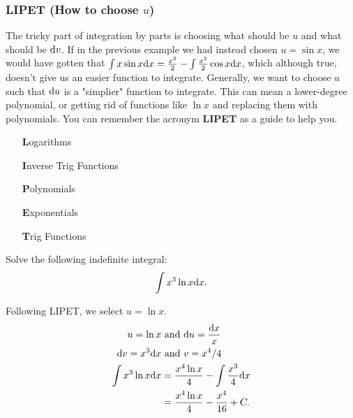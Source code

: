 \subsubsection{LIPET (How to choose $u$)}
The tricky part of integration by parts is choosing what should be $u$ and what should be $\mathrm{d} v$.
If in the previous example we had instead chosen $u=\sin{x}$, we would have gotten that $\int{x\sin{x}\mathrm{d} x} = \frac{x^2}{2}-\int{\frac{x^2}{2}\cos{x}\mathrm{d} x}$, which although true, doesn't give us an easier function to integrate.
Generally, we want to choose $u$ such that $\mathrm{d} u$ is a "simplier" function to integrate.
This can mean a lower-degree polynomial, or getting rid of functions like $\ln{x}$ and replacing them with polynomials.
You can remember the acronym \textbf{LIPET} as a guide to help you.
\begin{itemize}[align=left, leftmargin=0.66in]
	\item[\textbf{L}ogarithms]
	\item[\textbf{I}nverse Trig Functions]
	\item[\textbf{P}olynomials]
	\item[\textbf{E}xponentials]
	\item[\textbf{T}rig Functions]
\end{itemize}

\begin{example}
	Solve the following indefinite integral:
	\begin{equation*}
		\int{x^3\ln{x}\mathrm{d} x}.
	\end{equation*}
\end{example}
\begin{answer}
	Following LIPET, we select $u = \ln{x}$.
	\begin{align*}
		u = \ln{x} &\text{ and } \mathrm{d} u = \frac{\mathrm{d} x}{x} \\
		\mathrm{d} v = x^3\mathrm{d} x &\text{ and } v = x^4/4 \\
		\int{x^3\ln{x}\mathrm{d} x} &= \frac{x^4\ln{x}}{4} - \int{\frac{x^3}{4}\mathrm{d} x} \\
		&= \frac{x^4\ln{x}}{4} - \frac{x^4}{16} + C.
	\end{align*}
\end{answer}


